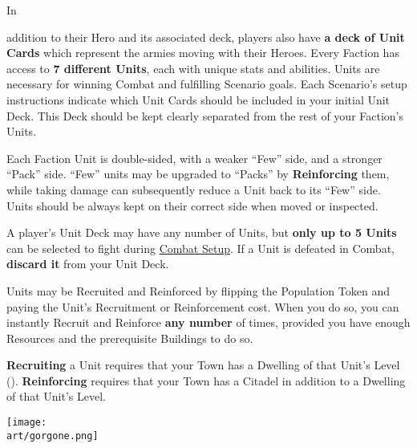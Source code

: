 
\begin{multicols*}{2}

\hypertarget{Units}{In} addition to their Hero and its associated deck, players also have \textbf{a deck of Unit Cards} which represent the armies moving with their Heroes.
Every Faction has access to \textbf{7 different Units}, each with unique stats and abilities.
Units are necessary for winning Combat and fulfilling Scenario goals.
Each Scenario's setup instructions indicate which Unit Cards should be included in your initial Unit Deck.
This Deck should be kept clearly separated from the rest of your Faction's Units.\par
Each Faction Unit is double-sided, with a weaker ``Few'' side, and a stronger ``Pack'' side.
``Few'' units may be upgraded to ``Packs'' by \textbf{Reinforcing} them, while taking damage can subsequently reduce a Unit back to its ``Few'' side.
Units should be always kept on their correct side when moved or inspected.\par
A player's Unit Deck may have any number of Units, but \textbf{only up to 5 Units} can be selected to fight during \hyperlink{Combatsetup}{Combat Setup}.
If a Unit is defeated in Combat, \textbf{discard it} from your Unit Deck.\par
Units may be Recruited and Reinforced by flipping the Population Token and paying the Unit's Recruitment  or Reinforcement  cost.
When you do so, you can instantly Recruit and Reinforce \textbf{any number} of times, provided you have enough Resources and the prerequisite Buildings to do so.\par
\textbf{Recruiting} a Unit requires that your Town has a Dwelling of that Unit's Level ().
\textbf{Reinforcing} requires that your Town has a Citadel in addition to a Dwelling of that Unit's Level.\par


\vspace*{\fill}
  \hspace{1em}
\texttt{[image: \\art/gorgone.png]}

\clearpage

\end{multicols*}
